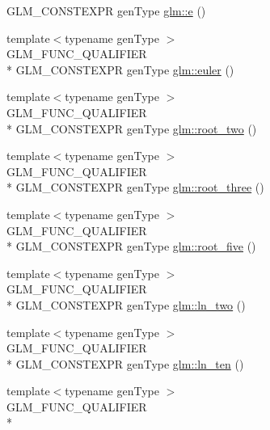 \begin{DoxyCompactItemize}
G\-L\-M\-\_\-\-C\-O\-N\-S\-T\-E\-X\-P\-R gen\-Type \hyperlink{group__gtc__constants_ga4b7956eb6e2fbedfc7cf2e46e85c5139}{glm\-::e} ()
\item 
{\footnotesize template$<$typename gen\-Type $>$ }\\G\-L\-M\-\_\-\-F\-U\-N\-C\-\_\-\-Q\-U\-A\-L\-I\-F\-I\-E\-R \\*
G\-L\-M\-\_\-\-C\-O\-N\-S\-T\-E\-X\-P\-R gen\-Type \hyperlink{group__gtc__constants_gad8fe2e6f90bce9d829e9723b649fbd42}{glm\-::euler} ()
\item 
{\footnotesize template$<$typename gen\-Type $>$ }\\G\-L\-M\-\_\-\-F\-U\-N\-C\-\_\-\-Q\-U\-A\-L\-I\-F\-I\-E\-R \\*
G\-L\-M\-\_\-\-C\-O\-N\-S\-T\-E\-X\-P\-R gen\-Type \hyperlink{group__gtc__constants_ga74e607d29020f100c0d0dc46ce2ca950}{glm\-::root\-\_\-two} ()
\item 
{\footnotesize template$<$typename gen\-Type $>$ }\\G\-L\-M\-\_\-\-F\-U\-N\-C\-\_\-\-Q\-U\-A\-L\-I\-F\-I\-E\-R \\*
G\-L\-M\-\_\-\-C\-O\-N\-S\-T\-E\-X\-P\-R gen\-Type \hyperlink{group__gtc__constants_ga4f286be4abe88be1eed7d2a9f6cb193e}{glm\-::root\-\_\-three} ()
\item 
{\footnotesize template$<$typename gen\-Type $>$ }\\G\-L\-M\-\_\-\-F\-U\-N\-C\-\_\-\-Q\-U\-A\-L\-I\-F\-I\-E\-R \\*
G\-L\-M\-\_\-\-C\-O\-N\-S\-T\-E\-X\-P\-R gen\-Type \hyperlink{group__gtc__constants_gae9ebbded75b53d4faeb1e4ef8b3347a2}{glm\-::root\-\_\-five} ()
\item 
{\footnotesize template$<$typename gen\-Type $>$ }\\G\-L\-M\-\_\-\-F\-U\-N\-C\-\_\-\-Q\-U\-A\-L\-I\-F\-I\-E\-R \\*
G\-L\-M\-\_\-\-C\-O\-N\-S\-T\-E\-X\-P\-R gen\-Type \hyperlink{group__gtc__constants_ga24f4d27765678116f41a2f336ab7975c}{glm\-::ln\-\_\-two} ()
\item 
{\footnotesize template$<$typename gen\-Type $>$ }\\G\-L\-M\-\_\-\-F\-U\-N\-C\-\_\-\-Q\-U\-A\-L\-I\-F\-I\-E\-R \\*
G\-L\-M\-\_\-\-C\-O\-N\-S\-T\-E\-X\-P\-R gen\-Type \hyperlink{group__gtc__constants_gaf97ebc6c059ffd788e6c4946f71ef66c}{glm\-::ln\-\_\-ten} ()
\item 
{\footnotesize template$<$typename gen\-Type $>$ }\\G\-L\-M\-\_\-\-F\-U\-N\-C\-\_\-\-Q\-U\-A\-L\-I\-F\-I\-E\-R \\*

\end{DoxyCompactItemize}
